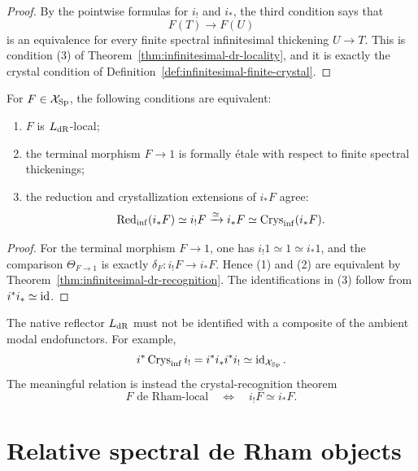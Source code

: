 \begin{proof}
By the pointwise formulas for $i_!$ and $i_*$, the third condition says that
\[
    F(T)\longrightarrow F(U)
\]
is an equivalence for every finite spectral infinitesimal thickening
$U\to T$.  This is condition (3) of
Theorem~\ref{thm:infinitesimal-dr-locality}, and it is exactly the crystal
condition of Definition~\ref{def:infinitesimal-finite-crystal}.
\end{proof}

\begin{corollary}
\label{cor:infinitesimal-native-formally-etale}
For $F\in\mathcal X_{\mathrm{Sp}}$, the following conditions are equivalent:
\begin{enumerate}
\item $F$ is $L_{\mathrm{dR}}$-local;
\item the terminal morphism $F\to1$ is formally \'etale with respect to finite
spectral thickenings;
\item the reduction and crystallization extensions of $i_*F$ agree:
\[
    \operatorname{Red}_{\mathrm{inf}}(i_*F)
    \simeq
    i_!F
    \xrightarrow{\simeq}
    i_*F
    \simeq
    \operatorname{Crys}_{\mathrm{inf}}(i_*F).
\]
\end{enumerate}
\end{corollary}

\begin{proof}
For the terminal morphism $F\to1$, one has $i_!1\simeq1\simeq i_*1$, and the
comparison $\Theta_{F\to1}$ is exactly
$\delta_F:i_!F\to i_*F$.  Hence (1) and (2) are equivalent by
Theorem~\ref{thm:infinitesimal-dr-recognition}.  The identifications in (3)
follow from $i^*i_*\simeq\operatorname{id}$.
\end{proof}

\begin{remark}
\label{rem:infinitesimal-dr-not-crystallization}
The native reflector $L_{\mathrm{dR}}$ must not be identified with a composite of the
ambient modal endofunctors.  For example,
\[
    i^*\operatorname{Crys}_{\mathrm{inf}} i_!
    =i^*i_*i^*i_!
    \simeq\operatorname{id}_{\mathcal X_{\mathrm{Sp}}}.
\]
The meaningful relation is instead the crystal-recognition theorem
\[
    F\text{ de Rham-local}
    \quad\Longleftrightarrow\quad
    i_!F\simeq i_*F.
\]
\end{remark}

\section{Relative spectral de Rham objects}
\label{sec:infinitesimal-relative-dr}

